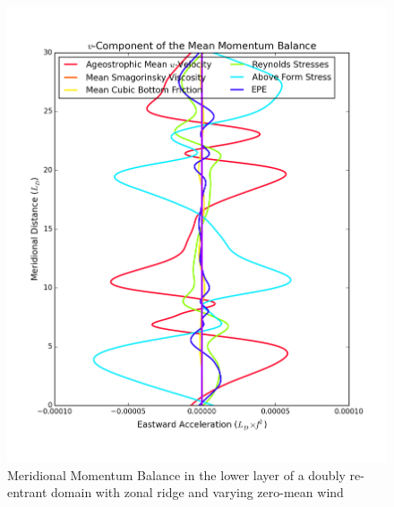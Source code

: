 \documentclass[12pt,a4paper]{report}
\begin{document}
 
 \begin{figure}
 	\centering
 	\begin{minipage}[b]{0.45\linewidth}
 		\centering
 		\includegraphics[width=\linewidth ]{vmom_1}
 		\caption{Meridional Momentum Balance in the lower layer of 
 			a doubly re-entrant domain with 
 			zonal ridge and varying zero-mean wind}
 		\label{fig:vmomlayer1}
 	\end{minipage}
 	\quad
 	\begin{minipage}[b]{0.45\linewidth}
 		\centering

\end{minipage}
\end{figure}
\end{document}
